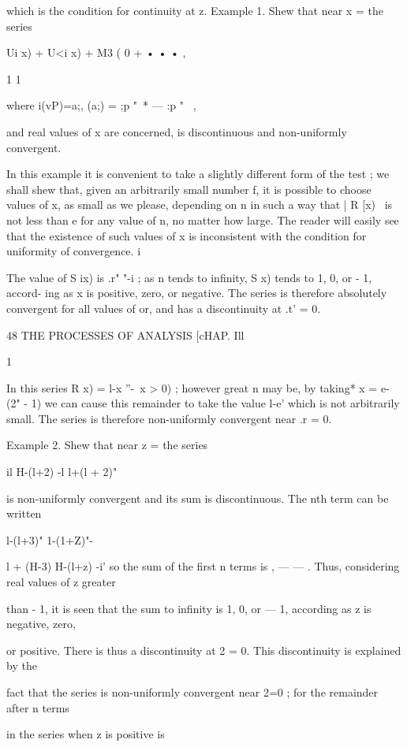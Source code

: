 which is the condition for continuity at z. Example 1. Shew that near
x = the series

Ui x) + U<i x) + M3 ( 0 + • • • ,

1 1

where i(vP)=a;, (a;) = ;p "~* — :p "~ ,

and real values of x are concerned, is discontinuous and non-uniformly
convergent.

In this example it is convenient to take a slightly different form of
the test ; we shall shew that, given an arbitrarily small number f, it
is possible to choose values of x, as small as we please, depending on
n in such a way that | R [x) \ is not less than e for any value of n,
no matter how large. The reader will easily see that the existence of
such values of x is inconsistent with the condition for uniformity of
convergence. i\

The value of S ix) is .r" "-i ; as n tends to infinity, S x) tends to
1, 0, or - 1, accord- ing as x is positive, zero, or negative. The
series is therefore absolutely convergent for all values of or, and
has a discontinuity at .t' = 0.



48 THE PROCESSES OF ANALYSIS [cHAP. Ill

1

In this series R x) = l-x ''-\ x > 0) ; however great n may be, by
taking* x = e- (2" - 1) we can cause this remainder to take the value
l-e' which is not arbitrarily small. The series is therefore
non-uniformly convergent near .r = 0.

Example 2. Shew that near z = the series

 il H-(l+2) -l l+(l + 2)"

is non-uniformly convergent and its sum is discontinuous. The nth term
can be written

l-(l+3)" 1-(1+Z)"-

l + (H-3) H-(l+z) -i' so the sum of the first n terms is , — — . Thus,
considering real values of z greater

than - 1, it is seen that the sum to infinity is 1, 0, or — 1,
according as z is negative, zero,

or positive. There is thus a discontinuity at 2 = 0. This
discontinuity is explained by the

fact that the series is non-uniformly convergent near 2=0 ; for the
remainder after n terms

in the series when z is positive is

